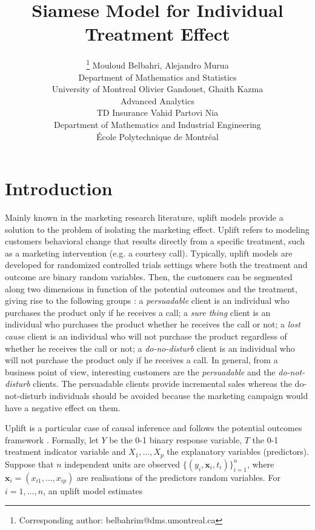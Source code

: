 \documentclass{article}
\title{Siamese Model for Individual Treatment Effect}
\author{
  \thanks{Corresponding author: belbahrim@dms.umontreal.ca} Mouloud Belbahri, Alejandro Murua \\
  Department of Mathematics and Statistics\\
  University of Montreal
  \And
  Olivier Gandouet, Ghaith Kazma \\
  Advanced Analytics\\
  TD Insurance
  \And
  Vahid Partovi Nia \\
  Department of Mathematics and Industrial Engineering\\
  École Polytechnique de Montréal
}
\def\x{\mathbf x}
\begin{document}
\maketitle

\begin{abstract}

\end{abstract}



\section{Introduction}
\label{sec:intro}

Mainly known in the marketing research literature, uplift models \citep{radcliffe1999differential, hansotia2002direct, lo2002true, radcliffe2007using} provide a solution to the problem of isolating the marketing effect. Uplift refers to modeling customers behavioral change that results directly from a specific treatment, such as a marketing intervention (e.g. a courtesy call). Typically, uplift models are developed for randomized controlled trials settings where both the treatment and outcome are binary random variables. Then, the customers can be segmented along two dimensions in function of the potential outcomes and the treatment, giving rise to the following groups \citep{kane2014mining} : a \textit{persuadable} client is an individual who purchases the product only if he receives a call; a \textit{sure thing} client is an individual who purchases the product whether he receives the call or not; a \textit{lost cause} client is an individual who will not purchase the product regardless of whether he receives the call or not; a \textit{do-no-disturb} client is an individual who will not purchase the product only if he receives a call. In general, from a business point of view, interesting customers are the \textit{persuadable} and the \textit{do-not-disturb} clients. The persuadable clients provide incremental sales whereas the do-not-disturb individuals should be avoided because the marketing campaign would have a negative effect on them.

Uplift is a particular case of causal inference and follows the potential outcomes framework \citep{rubin1974estimating, holland1986statistics}. Formally, let $Y$ be the 0-1 binary response variable, $T$ the 0-1 treatment indicator variable and $X_1,\ldots,X_p$ the explanatory variables (predictors). Suppose that $n$ independent units are observed $\{(y_i, \textbf{x}_i, t_i)\}_{i=1}^n$, where $\x_i = (x_{i1}, \ldots, x_{ip})$ are realisations of the predictors random variables. For $i=1,\ldots,n$, an uplift model estimates
\end{document}
